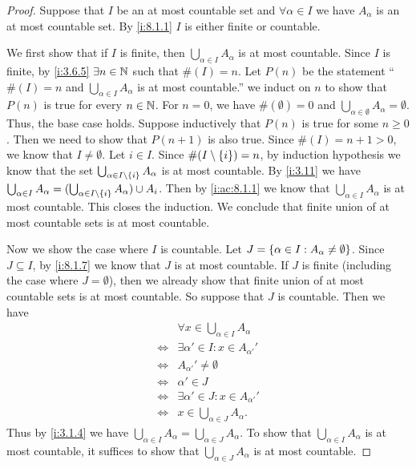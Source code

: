 \begin{proof}
  Suppose that \(I\) be an at most countable set and \(\forall \alpha \in I\) we have \(A_{\alpha}\) is an at most countable set.
  By \cref{i:8.1.1} \(I\) is either finite or countable.

  We first show that if \(I\) is finite, then \(\bigcup_{\alpha \in I} A_{\alpha}\) is at most countable.
  Since \(I\) is finite, by \cref{i:3.6.5} \(\exists n \in \mathbb{N}\) such that \(\#(I) = n\).
  Let \(P(n)\) be the statement ``\(\#(I) = n\) and \(\bigcup_{\alpha \in I} A_{\alpha}\) is at most countable.''
  we induct on \(n\) to show that \(P(n)\) is true for every \(n \in \mathbb{N}\).
  For \(n = 0\), we have \(\#(\emptyset) = 0\) and \(\bigcup_{\alpha \in \emptyset} A_{\alpha} = \emptyset\).
  Thus, the base case holds.
  Suppose inductively that \(P(n)\) is true for some \(n \geq 0\).
  Then we need to show that \(P(n + 1)\) is also true.
  Since \(\#(I) = n + 1 > 0\), we know that \(I \neq \emptyset\).
  Let \(i \in I\).
  Since \(\#(I \setminus \left\lbrace i\right\rbrace) = n\), by induction hypothesis we know that the set \(\bigcup_{\alpha \in I \setminus \left\lbrace i\right\rbrace} A_{\alpha}\) is at most countable.
  By \cref{i:3.11} we have \(\bigcup_{\alpha \in I} A_{\alpha} = (\bigcup_{\alpha \in I \setminus \left\lbrace i\right\rbrace} A_{\alpha}) \cup A_i\).
  Then by \cref{i:ac:8.1.1} we know that \(\bigcup_{\alpha \in I} A_{\alpha}\) is at most countable.
  This closes the induction.
  We conclude that finite union of at most countable sets is at most countable.

  Now we show the case where \(I\) is countable.
  Let \(J = \left\lbrace\alpha \in I : A_{\alpha} \neq \emptyset\right\rbrace\).
  Since \(J \subseteq I\), by \cref{i:8.1.7} we know that \(J\) is at most countable.
  If \(J\) is finite (including the case where \(J = \emptyset\)), then we already show that finite union of at most countable sets is at most countable.
  So suppose that \(J\) is countable.
  Then we have
  \begin{align*}
         & \forall x \in \bigcup_{\alpha \in I} A_{\alpha} \\
    \iff & \exists \alpha' \in I : x \in A_{\alpha'}'      \\
    \iff & A_{\alpha'}' \neq \emptyset                     \\
    \iff & \alpha' \in J                                   \\
    \iff & \exists \alpha' \in J : x \in A_{\alpha'}'      \\
    \iff & x \in \bigcup_{\alpha \in J} A_{\alpha}.
  \end{align*}
  Thus by \cref{i:3.1.4} we have \(\bigcup_{\alpha \in I} A_{\alpha} = \bigcup_{\alpha \in J} A_{\alpha}\).
  To show that \(\bigcup_{\alpha \in I} A_{\alpha}\) is at most countable, it suffices to show that \(\bigcup_{\alpha \in J} A_{\alpha}\) is at most countable.


\end{proof}
